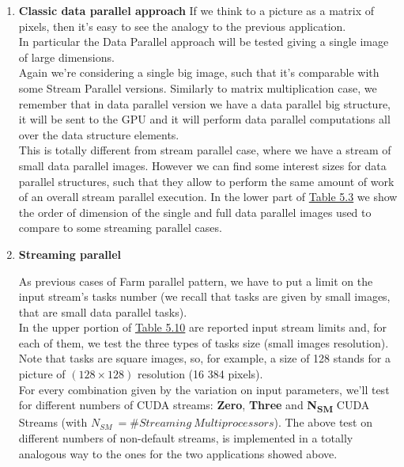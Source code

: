 \begin{enumerate}
	\item \textbf{Classic data parallel approach}
	If we think to a picture as a matrix of pixels, then it's easy to see the analogy to the previous application.\\
	In particular the Data Parallel approach will be tested giving a single image of large dimensions.\\
	Again we're considering a single big image, such that it's comparable with some Stream Parallel versions. Similarly to matrix multiplication case, we remember that in data parallel version we have a data parallel big structure, it will be sent to the GPU and it will perform data parallel computations all over the data structure elements.\\
	This is totally different from stream parallel case, where we have a stream of small data parallel images.
	However we can find some interest sizes for data parallel structures, such that they allow to perform the same amount of work of an overall stream parallel execution.
	In the lower part of \hyperref[tab:imgdata]{Table 5.3} we show the order of dimension of the single and full data parallel images used to compare to some streaming parallel cases.
	
	\item \textbf{Streaming parallel}
	
	As previous cases of Farm parallel pattern, we have to put a limit on the input stream's tasks number (we recall that tasks are given by small images, that are small data parallel tasks).\\
	In the upper portion of \hyperref[tab:imgdata]{Table 5.10} are reported input stream limits and, for each of them, we test the three types of tasks size (small images resolution). Note that tasks are square images, so, for example, a size of 128 stands for a picture of \((128\times128)\) resolution (16 384 pixels).\\
	For every combination given by the variation on input parameters, we'll test for different numbers of CUDA streams: \textbf{Zero}, \textbf{Three} and \textbf{N\textsubscript{SM}} CUDA Streams (with \(N_{SM} \ =\# Streaming \ Multiprocessors\)).
	The above test on different numbers of non-default streams, is implemented in a totally analogous way to the ones for the two applications showed above.
	
\end{enumerate}




